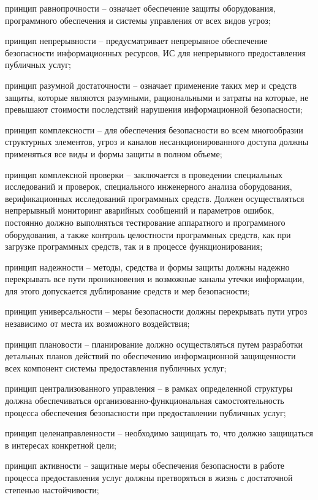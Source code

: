 \begin{textitemize}
	\item принцип равнопрочности -- означает обеспечение защиты оборудования, программного обеспечения и системы управления от всех видов угроз;
	\item принцип непрерывности -- предусматривает непрерывное обеспечение безопасности информационных ресурсов, ИС для непрерывного предоставления публичных услуг;
	\item принцип разумной достаточности -- означает применение таких мер и средств защиты, которые являются разумными, рациональными и затраты на которые, не превышают стоимости последствий нарушения информационной безопасности;
	\item принцип комплексности -- для обеспечения безопасности во всем многообразии структурных элементов, угроз и каналов несанкционированного доступа должны применяться все виды и формы защиты в полном объеме;
	\item принцип комплексной проверки -- заключается в проведении специальных исследований и проверок, специального инженерного анализа оборудования, верификационных исследований программных средств. Должен осуществляться непрерывный мониторинг аварийных сообщений и параметров ошибок, постоянно должно выполняться тестирование аппаратного и программного оборудования, а также контроль целостности программных средств, как при загрузке программных средств, так и в процессе функционирования;
	\item принцип надежности -- методы, средства и формы защиты должны надежно перекрывать все пути проникновения и возможные каналы утечки информации, для этого допускается дублирование средств и мер безопасности;
	\item принцип универсальности -- меры безопасности должны перекрывать пути угроз независимо от места их возможного воздействия;
	\item принцип плановости -- планирование должно осуществляться путем разработки детальных планов действий по обеспечению информационной защищенности всех компонент системы предоставления публичных услуг;
	\item принцип централизованного управления -- в рамках определенной структуры должна обеспечиваться организованно-функциональная самостоятельность процесса обеспечения безопасности при предоставлении публичных услуг;
	\item принцип целенаправленности -- необходимо защищать то, что должно защищаться в интересах конкретной цели;
	\item принцип активности -- защитные меры обеспечения безопасности в работе процесса предоставления услуг должны претворяться в жизнь с достаточной степенью настойчивости;

\end{textitemize}
